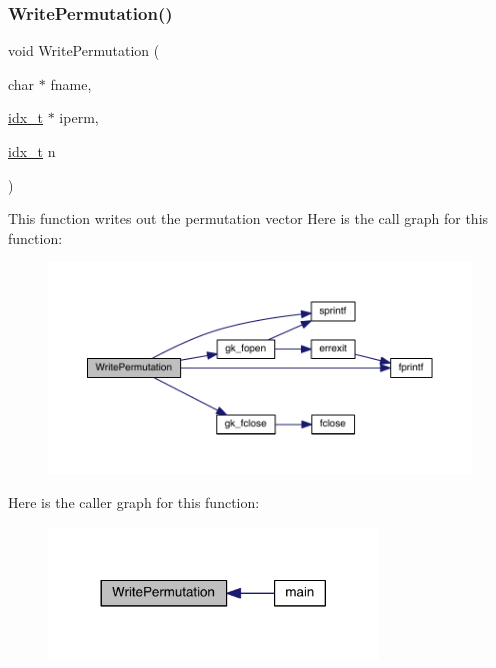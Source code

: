 \subsubsection{\texorpdfstring{Write\+Permutation()}{WritePermutation()}}
{\footnotesize\ttfamily void Write\+Permutation (\begin{DoxyParamCaption}\item[{char $\ast$}]{fname,  }\item[{\hyperlink{a00876_aaa5262be3e700770163401acb0150f52}{idx\+\_\+t} $\ast$}]{iperm,  }\item[{\hyperlink{a00876_aaa5262be3e700770163401acb0150f52}{idx\+\_\+t}}]{n }\end{DoxyParamCaption})}

This function writes out the permutation vector Here is the call graph for this function\+:\nopagebreak
\begin{figure}[H]
\begin{center}
\leavevmode
\includegraphics[width=350pt]{a00858_a902cc00039a655f4b6ec0292e0410ef2_cgraph}
\end{center}
\end{figure}
Here is the caller graph for this function\+:\nopagebreak
\begin{figure}[H]
\begin{center}
\leavevmode
\includegraphics[width=248pt]{a00858_a902cc00039a655f4b6ec0292e0410ef2_icgraph}
\end{center}
\end{figure}
